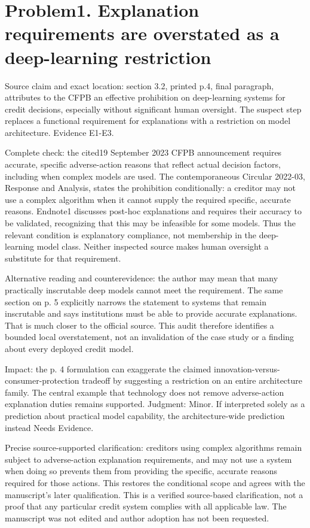 \documentclass[10pt]{article}
\begin{document}
\section*{Problem1. Explanation requirements are overstated as a deep-learning restriction}
Source claim and exact location: section 3.2, printed p.4, final paragraph, attributes to the CFPB an effective prohibition on deep-learning systems for credit decisions, especially without significant human oversight. The suspect step replaces a functional requirement for explanations with a restriction on model architecture. Evidence E1-E3.\par
Complete check: the cited19 September 2023 CFPB announcement requires accurate, specific adverse-action reasons that reflect actual decision factors, including when complex models are used. The contemporaneous Circular 2022-03, Response and Analysis, states the prohibition conditionally: a creditor may not use a complex algorithm when it cannot supply the required specific, accurate reasons. Endnote1 discusses post-hoc explanations and requires their accuracy to be validated, recognizing that this may be infeasible for some models. Thus the relevant condition is explanatory compliance, not membership in the deep-learning model class. Neither inspected source makes human oversight a substitute for that requirement.\par
Alternative reading and counterevidence: the author may mean that many practically inscrutable deep models cannot meet the requirement. The same section on p. 5 explicitly narrows the statement to systems that remain inscrutable and says institutions must be able to provide accurate explanations. That is much closer to the official source. This audit therefore identifies a bounded local overstatement, not an invalidation of the case study or a finding about every deployed credit model.\par
Impact: the p. 4 formulation can exaggerate the claimed innovation-versus-consumer-protection tradeoff by suggesting a restriction on an entire architecture family. The central example that technology does not remove adverse-action explanation duties remains supported. Judgment: Minor. If interpreted solely as a prediction about practical model capability, the architecture-wide prediction instead Needs Evidence.\par
Precise source-supported clarification: creditors using complex algorithms remain subject to adverse-action explanation requirements, and may not use a system when doing so prevents them from providing the specific, accurate reasons required for those actions. This restores the conditional scope and agrees with the manuscript’s later qualification. This is a verified source-based clarification, not a proof that any particular credit system complies with all applicable law. The manuscript was not edited and author adoption has not been requested.\par
\end{document}
